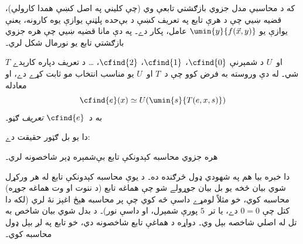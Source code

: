 \documentclass[../../../include/open-logic-section]{subfiles}
\begin{document}
که د محاسبې مدل جزوي بازګشتي تابعې وي (چې کليني په اصل کښې همدا
کارولې)، قضيه ښيي چې د هرې تابع په تعريف کښې د بې‌حده پلټنې يوازې يوه
کارونه، يعنې يوازې يو $\umin{y}{f(\vec x,y)}$ عامل، پکار دے۔ په دې
مانا قضيه ښيي چې هره جزوي بازګشتي تابع يو نورمال شکل لري۔

$T$ او~$U$ د شمېرنې $\cfind{0}$، $\cfind{1}$، $\cfind{2}$، \dots
د تعريف دپاره کارېدے شي۔ له دې وروسته به فرض کوو چې د~$T$ او~$U$ يو
مناسب انتخاب مو ثابت کړے دے، او معادله
\[
\cfind{e}(x) \simeq U(\umin{s}{T(e,x,s)})
\]
به د~$\cfind{e}$ \emph{تعريف} ګڼو۔

دا يو بل ګټور حقيقت دے:

\begin{thm}
هره جزوي محاسبه کېدونکې تابع بې‌شمېره ډېر شاخصونه لري۔
\end{thm}

دا خبره بيا هم په شهودي ډول څرګنده ده۔ د يوې محاسبه کېدونکې تابع له
هر ورکړل شوي بيان څخه يو بل بيان جوړولے شو چې هماغه تابع (د ننوت او
وت هماغه جوړه) محاسبه کوي، خو مثلاً لومړے داسې څه کوي چې پر محاسبه
هېڅ اغېز نۀ لري (لکه دا کتل چې $0=0$ دے، يا تر~$5$ پورې شمېرل، او
داسې نور)۔ د بدل شوي بيان شاخص به تل له اصلي شاخصه بېل وي۔ دواړه د
هماغې تابع شاخصونه دي، خو تابع په لږ بېل ډول محاسبه کوي۔
\end{document}
